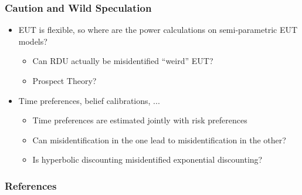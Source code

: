 \documentclass{beamer}
\begin{document}
\begin{frame}
\frametitle{Caution and Wild Speculation}
\begin{itemize}
	\item EUT is flexible, so where are the power calculations on semi-parametric EUT models?
		\begin{itemize}
			\item Can RDU actually be misidentified \enquote{weird} EUT?
			\item Prospect Theory?
		\end{itemize}
	\item Time preferences, belief calibrations, ...
		\begin{itemize}
			\item Time preferences are estimated jointly with risk preferences
			\item Can misidentification in the one lead to misidentification in the other?
			\item Is hyperbolic discounting misidentified exponential discounting?
		\end{itemize}
\end{itemize}
\end{frame}

\begin{frame}[allowframebreaks]
\frametitle{References}
\printbibliography[heading=subbibliography]
\end{frame}
\end{document}
